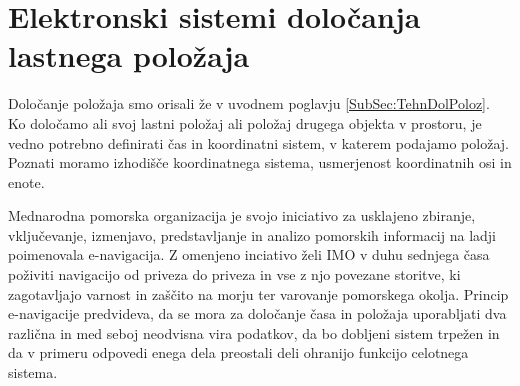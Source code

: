 %
\chapter{Elektronski sistemi določanja lastnega položaja}
\label{Ch:ElSistLastPoloz} %
Določanje položaja smo orisali že v uvodnem poglavju \ref{SubSec:TehnDolPoloz}. Ko določamo ali svoj lastni položaj ali položaj drugega objekta v prostoru, je vedno potrebno definirati čas in koordinatni sistem, v katerem podajamo položaj. Poznati moramo izhodišče koordinatnega sistema, usmerjenost koordinatnih osi in enote. 

Mednarodna pomorska organizacija je svojo iniciativo za usklajeno zbiranje, vključevanje, izmenjavo, predstavljanje in analizo pomorskih informacij na ladji poimenovala e-navigacija. Z omenjeno inciativo želi IMO v duhu sednjega časa poživiti navigacijo od priveza do priveza in vse z njo povezane storitve, ki zagotavljajo varnost in zaščito na morju ter varovanje pomorskega okolja. Princip e-navigacije predvideva, da se mora za določanje časa in položaja uporabljati dva različna in med seboj neodvisna vira podatkov, da bo dobljeni sistem trpežen in da v primeru odpovedi enega dela preostali deli ohranijo funkcijo celotnega sistema.


